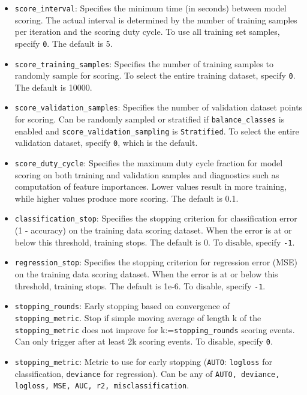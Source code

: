 {{\begin{itemize}
\item \texttt{score\_interval}: Specifies the minimum time (in seconds) between model scoring. The actual interval is determined by the number of training samples per iteration and the scoring duty cycle. To use all training set samples, specify \texttt{0}. The default is 5.

\item \texttt{score\_training\_samples}: Specifies the number of training samples to randomly sample for scoring. To select the entire training dataset, specify \texttt{0}.  The default is 10000.

\item \texttt{score\_validation\_samples}: Specifies the number of validation dataset points for scoring. Can be randomly sampled or stratified if  \texttt{balance\_classes} is enabled and \texttt{score\_validation\_sampling} is \texttt{Stratified}. To select the entire validation dataset, specify \texttt{0}, which is the default.

\item \texttt{score\_duty\_cycle}: Specifies the maximum duty cycle fraction for model scoring on both training and validation samples and diagnostics such as computation of feature importances. Lower values result in more training, while higher values produce more scoring. The default is 0.1.

\item \texttt{classification\_stop}: Specifies the stopping criterion for classification error (1 - accuracy) on the training data scoring dataset.  When the error is at or below this threshold, training stops.  The default is 0.  To disable, specify \texttt{-1}. 

\item \texttt{regression\_stop}: Specifies the stopping criterion for regression error (MSE) on the training data scoring dataset. When the error is at or below this threshold, training stops. The default is 1e-6.  To disable, specify \texttt{-1}.

\item \texttt{stopping\_rounds}: Early stopping based on convergence of \\\texttt{stopping\_metric}. Stop if simple moving average of length k of the \texttt{stopping\_metric} does not improve for k:=\texttt{stopping\_rounds} scoring events. Can only trigger after at least 2k scoring events. To disable, specify \texttt{0}.

\item \texttt{stopping\_metric}: Metric to use for early stopping (\texttt{AUTO}: \texttt{logloss} for classification, \texttt{deviance} for regression). Can be any of \texttt{AUTO, deviance, logloss, MSE, AUC, r2, misclassification}.


\end{itemize}}}
